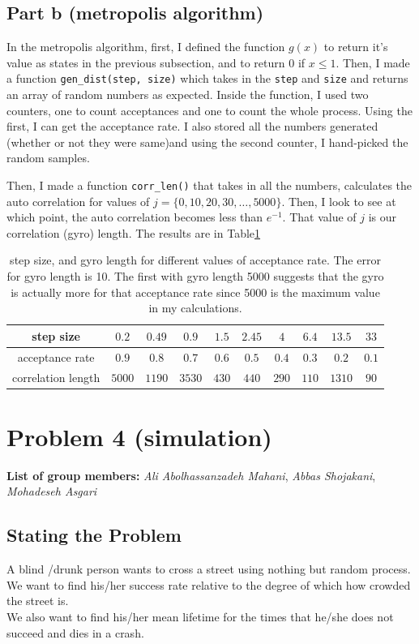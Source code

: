 \documentclass[12pt]{article}
\begin{document}
	\subsection{Part b (metropolis algorithm)}
	In the metropolis algorithm, first, I defined the function $g(x)$ to return it's value as states in the previous 
	subsection, and to return $0$ if $x \le 1$. Then, I made a function \texttt{gen\_dist(step, size)} which takes
	in the \texttt{step} and \texttt{size} and returns an array of random numbers as expected.
	Inside the function, I used two counters, one to count acceptances and one to count the whole process.
	Using the first, I can get the acceptance rate. I also stored all the numbers generated (whether or not they 
	were same)and using the second counter, I hand-picked the random samples.
	
	Then, I made a function \texttt{corr\_len()} that takes in all the numbers, calculates the auto correlation
	for values of $j = \{0, 10, 20, 30, \dots, 5000\}$. Then, I look to see at which point, the auto correlation becomes less than $e^{-1}$. That value of $j$ is our correlation (gyro) length.
	The results are in Table\ref{tab:gyro}
	\begin{table}[h]
		\centering
		\begin{tabular}{|c|c|c|c|c|c|c|c|c|c|}
			\hline
step size& $0.2$& $0.49$ & $0.9$ & $1.5$ & $2.45$ & $4$ & $6.4$ & $13.5$ & $33$ \\
 \hline
acceptance rate & $0.9$ & $0.8$ & $0.7$ & $0.6$ & $0.5$ & $0.4$ & $0.3$ & $0.2$ & $0.1$ \\
 \hline
correlation length & $5000$ & $1190$ & $3530$ & $430$ & $440$ & $290$ & $110$ & $1310$ & $90$ \\
 \hline
		\end{tabular}
	\label{tab:gyro}
	\caption{step size, and gyro length for different values of acceptance rate. The error for gyro length is 10.
	The first with gyro length 5000 suggests that the gyro is actually more for that acceptance rate since 5000
	is the maximum value in my calculations.}
	\end{table}

	\section{Problem 4 (simulation)}
	\textbf{List of group members:} \emph{Ali Abolhassanzadeh Mahani}, \emph{Abbas Shojakani}, \emph{Mohadeseh Asgari}
	\subsection{Stating the Problem}
	A blind /drunk person wants to cross a street using nothing but random process.\\
	We want to find his/her success rate relative to the degree of which how crowded the street is.\\
	We also want to find his/her mean lifetime for the times that he/she does not succeed and dies in a crash.
\end{document}
